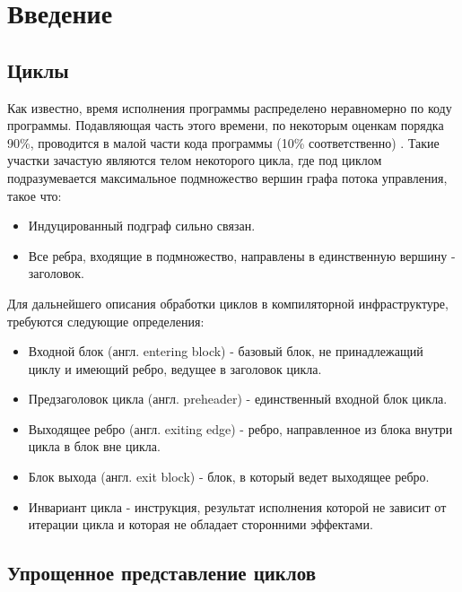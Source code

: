 \chapter{Введение}
\label{sec:Chapter0} 

\section{Циклы}

Как известно, время исполнения программы распределено неравномерно по коду программы.
Подавляющая часть этого времени, по некоторым оценкам порядка 90\%, проводится в малой части кода программы (10\% соответственно) \cite{Aho_Ullman_focs}.
Такие участки зачастую являются телом некоторого цикла, где под циклом подразумевается максимальное подмножество вершин графа потока управления, такое что:
\begin{itemize}
    \item Индуцированный подграф сильно связан.
    \item Все ребра, входящие в подмножество, направлены в единственную вершину - заголовок.
\end{itemize}

Для дальнейшего описания обработки циклов в компиляторной инфраструктуре, требуются следующие определения:
\begin{itemize}
    \item Входной блок (англ. entering block) - базовый блок, не принадлежащий циклу и имеющий ребро, ведущее в заголовок цикла.
    \item Предзаголовок цикла (англ. preheader) - единственный входной блок цикла.
    \item Выходящее ребро (англ. exiting edge) - ребро, направленное из блока внутри цикла в блок вне цикла.
    \item Блок выхода (англ. exit block) - блок, в который ведет выходящее ребро.
    \item Инвариант цикла - инструкция, результат исполнения которой не зависит от итерации цикла и которая не обладает сторонними эффектами.
\end{itemize}

\section{Упрощенное представление циклов}

